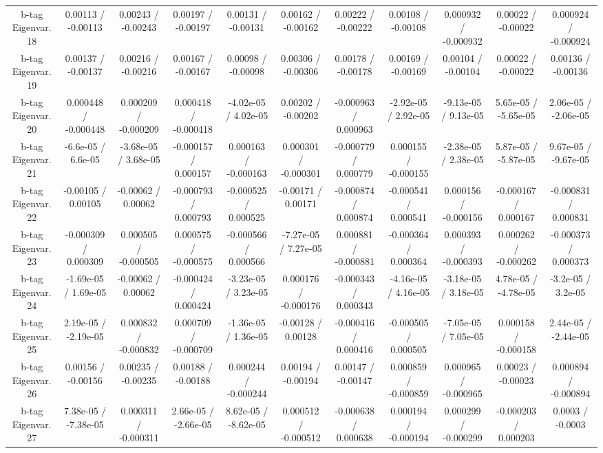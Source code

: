 {\begin{landscape}
\begin{longtable}{@{\extracolsep{\fill}}| *{11}{c|}}
  b-tag Eigenvar. 18 & 0.00113 / -0.00113 & 0.00243 / -0.00243 & 0.00197 / -0.00197 & 0.00131 / -0.00131 & 0.00162 / -0.00162 & 0.00222 / -0.00222 & 0.00108 / -0.00108 & 0.000932 / -0.000932 & 0.00022 / -0.00022 & 0.000924 / -0.000924 \\ 
  b-tag Eigenvar. 19 & 0.00137 / -0.00137 & 0.00216 / -0.00216 & 0.00167 / -0.00167 & 0.00098 / -0.00098 & 0.00306 / -0.00306 & 0.00178 / -0.00178 & 0.00169 / -0.00169 & 0.00104 / -0.00104 & 0.00022 / -0.00022 & 0.00136 / -0.00136 \\ 
  b-tag Eigenvar. 20 & 0.000448 / -0.000448 & 0.000209 / -0.000209 & 0.000418 / -0.000418 & -4.02e-05 / 4.02e-05 & 0.00202 / -0.00202 & -0.000963 / 0.000963 & -2.92e-05 / 2.92e-05 & -9.13e-05 / 9.13e-05 & 5.65e-05 / -5.65e-05 & 2.06e-05 / -2.06e-05 \\ 
  b-tag Eigenvar. 21 & -6.6e-05 / 6.6e-05 & -3.68e-05 / 3.68e-05 & -0.000157 / 0.000157 & 0.000163 / -0.000163 & 0.000301 / -0.000301 & -0.000779 / 0.000779 & 0.000155 / -0.000155 & -2.38e-05 / 2.38e-05 & 5.87e-05 / -5.87e-05 & 9.67e-05 / -9.67e-05 \\ 
  b-tag Eigenvar. 22 & -0.00105 / 0.00105 & -0.00062 / 0.00062 & -0.000793 / 0.000793 & -0.000525 / 0.000525 & -0.00171 / 0.00171 & -0.000874 / 0.000874 & -0.000541 / 0.000541 & 0.000156 / -0.000156 & -0.000167 / 0.000167 & -0.000831 / 0.000831 \\ 
  b-tag Eigenvar. 23 & -0.000309 / 0.000309 & 0.000505 / -0.000505 & 0.000575 / -0.000575 & -0.000566 / 0.000566 & -7.27e-05 / 7.27e-05 & 0.000881 / -0.000881 & -0.000364 / 0.000364 & 0.000393 / -0.000393 & 0.000262 / -0.000262 & -0.000373 / 0.000373 \\ 
  b-tag Eigenvar. 24 & -1.69e-05 / 1.69e-05 & -0.00062 / 0.00062 & -0.000424 / 0.000424 & -3.23e-05 / 3.23e-05 & 0.000176 / -0.000176 & -0.000343 / 0.000343 & -4.16e-05 / 4.16e-05 & -3.18e-05 / 3.18e-05 & 4.78e-05 / -4.78e-05 & -3.2e-05 / 3.2e-05 \\ 
  b-tag Eigenvar. 25 & 2.19e-05 / -2.19e-05 & 0.000832 / -0.000832 & 0.000709 / -0.000709 & -1.36e-05 / 1.36e-05 & -0.00128 / 0.00128 & -0.000416 / 0.000416 & -0.000505 / 0.000505 & -7.05e-05 / 7.05e-05 & 0.000158 / -0.000158 & 2.44e-05 / -2.44e-05 \\ 
  b-tag Eigenvar. 26 & 0.00156 / -0.00156 & 0.00235 / -0.00235 & 0.00188 / -0.00188 & 0.000244 / -0.000244 & 0.00194 / -0.00194 & 0.00147 / -0.00147 & 0.000859 / -0.000859 & 0.000965 / -0.000965 & 0.00023 / -0.00023 & 0.000894 / -0.000894 \\ 
  b-tag Eigenvar. 27 & 7.38e-05 / -7.38e-05 & 0.000311 / -0.000311 & 2.66e-05 / -2.66e-05 & 8.62e-05 / -8.62e-05 & 0.000512 / -0.000512 & -0.000638 / 0.000638 & 0.000194 / -0.000194 & 0.000299 / -0.000299 & -0.000203 / 0.000203 & 0.0003 / -0.0003 \\ 

\end{longtable}
\end{landscape}}

